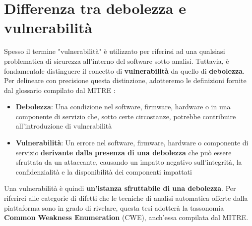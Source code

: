 \documentclass[../main.tex]{subfiles}
\begin{document}
\section{Differenza tra debolezza e vulnerabilità}
Spesso il termine "vulnerabilità" è utilizzato per riferirsi ad una qualsiasi problematica di sicurezza all'interno del software sotto analisi.
Tuttavia, è fondamentale distinguere il concetto di \textbf{vulnerabilità} da quello di \textbf{debolezza}.
Per delineare con precisione questa distinzione, adotteremo le definizioni fornite dal glossario compilato dal MITRE \cite{mitre_glossary}:
\begin{itemize}
    \item \textbf{Debolezza}: Una condizione nel software, firmware, hardware o in una componente di servizio che, sotto certe circostanze, potrebbe contribuire all'introduzione di vulnerabilità
    \item \textbf{Vulnerabilità}: Un errore nel software, firmware, hardware o componente di servizio \textbf{derivante dalla presenza di una debolezza} che può essere sfruttata da un attaccante, causando un impatto negativo sull'integrità, la confidenzialità e la disponibilità dei componenti impattati
\end{itemize}
Una vulnerabilità è quindi \textbf{un'istanza sfruttabile di una debolezza}.
Per riferirci alle categorie di difetti che le tecniche di analisi automatica offerte dalla piattaforma sono in grado di rivelare, questa tesi adotterà la tassonomia \textbf{Common Weakness Enumeration} (CWE), anch'essa compilata dal MITRE.
\end{document}
